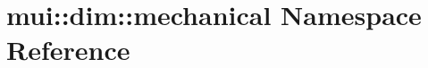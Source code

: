\hypertarget{namespacemui_1_1dim_1_1mechanical}{}\section{mui\+:\+:dim\+:\+:mechanical Namespace Reference}
\label{namespacemui_1_1dim_1_1mechanical}
